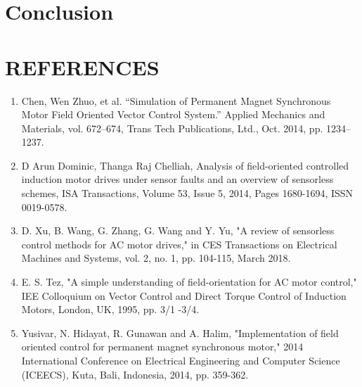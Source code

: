 \section{Conclusion}

\newpage


\section{\centering REFERENCES}


\begin{enumerate}

\item Chen, Wen Zhuo, et al. “Simulation of Permanent Magnet Synchronous Motor Field Oriented Vector Control System.” Applied Mechanics and Materials, vol. 672–674, Trans Tech Publications, Ltd., Oct. 2014, pp. 1234–1237.


\vspace{5mm} %

\item D Arun Dominic, Thanga Raj Chelliah,
Analysis of field-oriented controlled induction motor drives under sensor faults and an overview of sensorless schemes,
ISA Transactions,
Volume 53, Issue 5,
2014,
Pages 1680-1694,
ISSN 0019-0578.

\vspace{5mm} %

\item D. Xu, B. Wang, G. Zhang, G. Wang and Y. Yu, "A review of sensorless control methods for AC motor drives," in CES Transactions on Electrical Machines and Systems, vol. 2, no. 1, pp. 104-115, March 2018.


\vspace{5mm} %

\item  E. S. Tez, "A simple understanding of field-orientation for AC motor control," IEE Colloquium on Vector Control and Direct Torque Control of Induction Motors, London, UK, 1995, pp. 3/1 -3/4.

\vspace{5mm} %


\item  Yusivar, N. Hidayat, R. Gunawan and A. Halim, "Implementation of field oriented control for permanent magnet synchronous motor," 2014 International Conference on Electrical Engineering and Computer Science (ICEECS), Kuta, Bali, Indonesia, 2014, pp. 359-362.

\end{enumerate}
